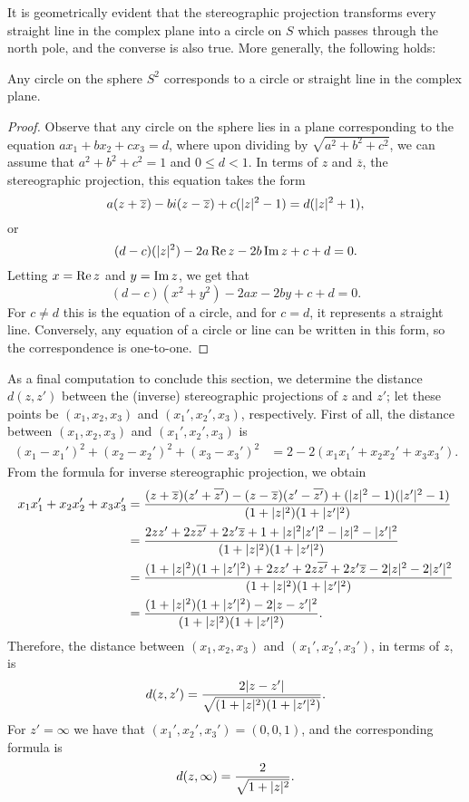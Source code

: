 It is geometrically evident that the stereographic projection transforms every straight line in the complex plane into a circle on $S$ which passes through the north pole, and the converse is also true. More generally, the following holds:
\begin{proposition}
	Any circle on the sphere $S^2$ corresponds to a circle or straight line in the complex plane.
\end{proposition}
\begin{proof}
	Observe that any circle on the sphere lies in a plane corresponding to the equation $ax_1+bx_2+cx_3=d$, where upon dividing by $\sqrt{a^2+b^2+c^2}$, we can assume that $a^2+b^2+c^2=1$ and $0 \le d<1$. In terms of $z$ and $\overline{z}$, the stereographic projection, this equation takes the form $$a(z+\overline{z})-bi(z-\overline{z})+c(\lvert z \rvert^2-1)=d(\lvert z \rvert^2+1),$$ or $$(d-c)(\lvert z \rvert^2)-2a\operatorname{Re} z-2b\operatorname{Im} z+c+d=0.$$ Letting $x=\operatorname{Re} z$ and $y=\operatorname{Im} z$, we get that $$(d-c)(x^2+y^2)-2ax-2by+c+d=0.$$ For $c \neq d$ this is the equation of a circle, and for $c=d$, it represents a straight line. Conversely, any equation of a circle or line can be written in this form, so the correspondence is one-to-one.
\end{proof}

As a final computation to conclude this section, we determine the distance $d(z,z')$ between the (inverse) stereographic projections of $z$ and $z'$; let these points be  $(x_1,x_2,x_3)$ and $(x_1',x_2',x_3)$, respectively. First of all, the distance between $(x_1,x_2,x_3)$ and $(x_1',x_2',x_3)$ is
\begin{align*}
	(x_1-x_1')^2+(x_2-x_2')^2+(x_3-x_3')^2 &=2-2(x_1x_1'+x_2x_2'+x_3x_3').
\end{align*}
From the formula for inverse stereographic projection, we obtain
\begin{align*}
	x_1x_1'+x_2x_2'+x_3x_3' &=\dfrac{(z+\overline{z})(z'+\overline{z'})-(z-\overline{z})(z'-\overline{z'})+(\lvert z \rvert^2-1)(\lvert z' \rvert^2-1)}{(1+\lvert z \rvert^2)(1+\lvert z' \rvert^2)} \\
	&=\dfrac{2zz'+2z\overline{z'}+2z'\overline{z}+1+\lvert z \rvert^2\lvert z' \rvert^2-\lvert z \rvert^2-\lvert z' \rvert^2}{(1+\lvert z \rvert^2)(1+\lvert z' \rvert^2)} \\
	&=\dfrac{(1+\lvert z \rvert^2)(1+\lvert z' \rvert^2)+2zz'+2z\overline{z'}+2z'\overline{z}-2\lvert z \rvert^2-2\lvert z' \rvert^2}{(1+\lvert z \rvert^2)(1+\lvert z' \rvert^2)} \\
	&=\dfrac{(1+\lvert z \rvert^2)(1+\lvert z' \rvert^2)-2\lvert z-z' \rvert^2}{(1+\lvert z \rvert^2)(1+\lvert z' \rvert^2)}.
\end{align*}
Therefore, the distance between $(x_1,x_2,x_3)$ and $(x_1',x_2',x_3')$, in terms of $z$, is $$d(z,z')=\dfrac{2\lvert z-z' \rvert}{\sqrt{(1+\lvert z \rvert^2)(1+\lvert z' \rvert^2)}}.$$ For $z'=\infty$ we have that $(x_1',x_2',x_3')=(0,0,1)$, and the corresponding formula is $$d(z,\infty)=\dfrac{2}{\sqrt{1+\lvert z \rvert^2}}.$$

